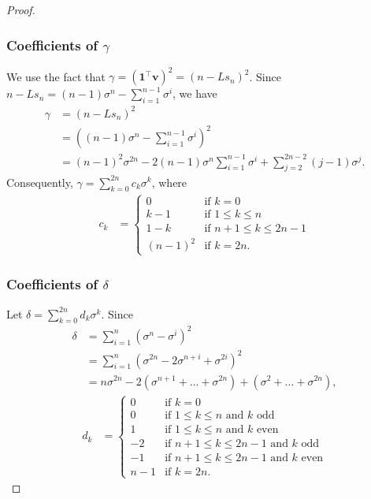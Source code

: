 \documentclass{article}
\theoremstyle{plain}
\theoremstyle{definition}
\theoremstyle{remark}
\def\bigopen#1{\left(#1\right)}
\def\vone{{\bm{1}}}
\def\vv{{\bm{v}}}
\begin{document}
\begin{proof}
\subsubsection*{Coefficients of $\gamma$}
We use the fact that $\gamma = \bigopen{\vone^{\top} \vv}^2 = (n - Ls_n)^2$.
Since $n-Ls_{n}=(n-1)\sigma^n-\sum_{i=1}^{n-1}\sigma^i$, we have 
\begin{align*}
    \gamma &= (n-Ls_{n})^2\\
    &= \bigopen{ (n-1)\sigma^n-\sum_{i=1}^{n-1}\sigma^i }^2\\
    &= (n-1)^2\sigma^{2n}-2(n-1)\sigma^n \sum_{i=1}^{n-1} \sigma^i+\sum_{j=2}^{2n-2}(j-1)\sigma^j.
\end{align*}
Consequently, $\gamma=\sum_{k=0}^{2n}c_{k}\sigma^k$, where \begin{align*}
    c_k &= 
    \begin{cases}
        0 &\text{if } k=0\\
        k - 1 &\text{if } 1\le k\le n\\
        1 - k &\text{if } n + 1\le k\le 2n - 1 \\
        (n - 1)^2 &\text{if } k = 2n.
    \end{cases}
\end{align*}

\subsubsection*{Coefficients of $\delta$}
Let $\delta=\sum_{k=0}^{2n}d_{k}\sigma^k$.
Since 
\begin{align*}
\delta &= \sum_{i=1}^n(\sigma^n-\sigma^i)^2\\
&= \sum_{i=1}^n (\sigma^{2n}-2\sigma^{n+i}+\sigma^{2i})^2\\
&= n\sigma^{2n} - 2(\sigma^{n+1}+\dots+\sigma^{2n})+(\sigma^2+\dots+\sigma^{2n}),
\end{align*}
\begin{align*}
    d_k &= \begin{cases}
        0 &\text{if } k = 0 \\
        0 &\text{if } 1 \le k \le n \text{ and } k \text{ odd} \\
        1 &\text{if } 1 \le k \le n \text{ and } k \text{ even} \\
        -2 &\text{if } n+1 \le k \le 2n-1 \text{ and } k \text{ odd} \\
        -1 &\text{if } n+1 \le k \le 2n-1 \text{ and } k \text{ even} \\
        n-1 &\text{if } k=2n.
    \end{cases}
\end{align*}


\end{proof}
\end{document}
